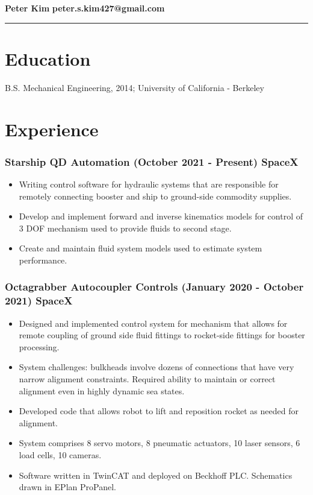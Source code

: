 \documentclass[11pt]{article}
\begin{document}
\thispagestyle{empty}
\noindent
{\Huge \textbf{Peter Kim}} \hfill \textbf{peter.s.kim427@gmail.com}
\vspace{3pt}
\hrule

\section*{Education}
B.S. Mechanical Engineering, 2014; University of California - Berkeley

\section*{Experience}
    \subsubsection*{Starship QD Automation
                    (October 2021 - Present) \hfill SpaceX}
        \begin{itemize}
            \setlength\itemsep{-0.5em}
            \item Writing control software for hydraulic systems that are
                  responsible for remotely connecting booster and ship to
                  ground-side commodity supplies.
            \item Develop and implement forward and inverse kinematics 
                  models for control of 3 DOF mechanism used to provide
                  fluids to second stage.
            \item Create and maintain fluid system models used to estimate
                  system performance.
            
        \end{itemize}
        
    \subsubsection*{Octagrabber Autocoupler Controls 
                    (January 2020 - October 2021) \hfill SpaceX}
        \begin{itemize}
            \setlength\itemsep{-0.5em}
            \item Designed and implemented control system for mechanism that
                  allows for remote coupling of ground side fluid fittings to
                  rocket-side fittings for booster processing.
            \item System challenges: bulkheads involve dozens of 
                  connections that have very narrow alignment constraints.
                  Required ability to maintain or correct alignment
                  even in highly dynamic sea states.
            \item Developed code that allows robot to lift and
                  reposition rocket as needed for alignment.
            \item System comprises 8 servo motors, 8 pneumatic actuators,
                  10 laser sensors, 6 load cells, 10 cameras.
            \item Software written in TwinCAT and deployed on Beckhoff PLC. 
                  Schematics drawn in EPlan ProPanel.
        \end{itemize}
\end{document}
